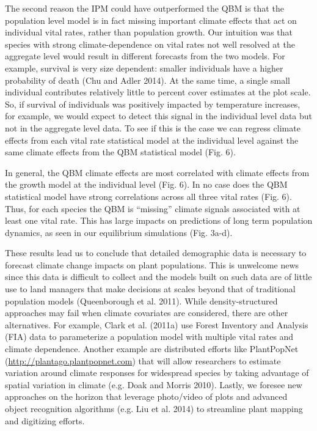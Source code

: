 \documentclass[12pt,]{article}
\begin{document}
The second reason the IPM could have outperformed the QBM is that the
population level model is in fact missing important climate effects that
act on individual vital rates, rather than population growth. Our
intuition was that species with strong climate-dependence on vital rates
not well resolved at the aggregate level would result in different
forecasts from the two models. For example, survival is very size
dependent: smaller individuals have a higher probability of death (Chu
and Adler 2014). At the same time, a single small individual contributes
relatively little to percent cover estimates at the plot scale. So, if
survival of individuals was positively impacted by temperature
increases, for example, we would expect to detect this signal in the
individual level data but not in the aggregate level data. To see if
this is the case we can regress climate effects from each vital rate
statistical model at the individual level against the same climate
effects from the QBM statistical model (Fig. 6).

In general, the QBM climate effects are most correlated with climate
effects from the growth model at the individual level (Fig. 6). In no
case does the QBM statistical model have strong correlations across all
three vital rates (Fig. 6). Thus, for each species the QBM is
``missing'' climate signals associated with at least one vital rate.
This has large impacts on predictions of long term population dynamics,
as seen in our equilibrium simulations (Fig. 3a-d).

These results lead us to conclude that detailed demographic data is
necessary to forecast climate change impacts on plant populations. This
is unwelcome news since this data is difficult to collect and the models
built on such data are of little use to land managers that make
decisions at scales beyond that of traditional population models
(Queenborough et al. 2011). While density-structured approaches may fail
when climate covariates are considered, there are other alternatives.
For example, Clark et al. (2011a) use Forest Inventory and Analysis
(FIA) data to parameterize a population model with multiple vital rates
and climate dependence. Another example are distributed efforts like
PlantPopNet (\url{http://plantago.plantpopnet.com}) that will allow
researchers to estimate variation around climate responses for
widespread species by taking advantage of spatial variation in climate
(e.g. Doak and Morris 2010). Lastly, we foresee new approaches on the
horizon that leverage photo/video of plots and advanced object
recognition algorithms (e.g. Liu et al. 2014) to streamline plant
mapping and digitizing efforts.
\end{document}
